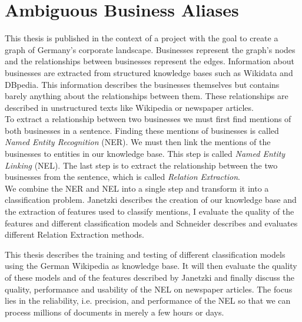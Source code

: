 \section{Ambiguous Business Aliases}
This thesis is published in the context of a project with the goal to create a graph of Germany's corporate landscape. Businesses represent the graph's nodes and the relationships between businesses represent the edges. Information about businesses are extracted from structured knowledge bases such as Wikidata and DBpedia. This information describes the businesses themselves but contains barely anything about the relationships between them. These relationships are described in unstructured texts like Wikipedia or newspaper articles.\\
To extract a relationship between two businesses we must first find mentions of both businesses in a sentence. Finding these mentions of businesses is called \textit{Named Entity Recognition} (NER). We must then link the mentions of the businesses to entities in our knowledge base. This step is called \textit{Named Entity Linking} (NEL). The last step is to extract the relationship between the two businesses from the sentence, which is called \textit{Relation Extraction}.\\
We combine the NER and NEL into a single step and transform it into a classification problem. Janetzki \cite{janetzki} describes the creation of our knowledge base and the extraction of features used to classify mentions, I evaluate the quality of the features and different classification models and Schneider \cite{schneider} describes and evaluates different Relation Extraction methods.\par
This thesis describes the training and testing of different classification models using the German Wikipedia as knowledge base. It will then evaluate the quality of these models and of the features described by Janetzki \cite{janetzki} and finally discuss the quality, performance and usability of the NEL on newspaper articles. The focus lies in the reliability, i.e. precision, and performance of the NEL so that we can process millions of documents in merely a few hours or days.

